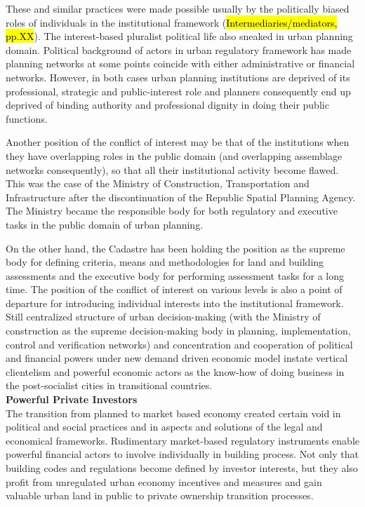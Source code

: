 \documentclass[11pt]{report}
\begin{document}
These and similar practices were made possible usually by the politically biased roles of individuals in the institutional framework (\hl{Intermediaries/mediators, pp.XX}).
The interest-based pluralist political life also sneaked in urban planning domain.
Political background of actors in urban regulatory framework has made planning networks at some points coincide with either administrative or financial networks.
However, in both cases urban planning institutions are deprived of its professional, strategic and public-interest role and planners consequently end up deprived of binding authority and professional dignity in doing their public functions.

Another position of the conflict of interest may be that of the institutions when they have overlapping roles in the public domain (and overlapping assemblage networks consequently), so that all their institutional activity become flawed.
This was the case of the Ministry of Construction, Transportation and Infrastructure after the discontinuation of the Republic Spatial Planning Agency. The Ministry became the responsible body for both regulatory and executive tasks in the public domain of urban planning.

On the other hand, the Cadastre has been holding the position  as the supreme body for defining criteria, means and methodologies for land and building assessments and the executive body for performing assessment tasks for a long time.
The position of the conflict of interest on various levels is also a point of departure for introducing individual interests into the institutional framework. Still centralized structure of urban decision-making (with the Ministry of construction as the supreme decision-making body in planning, implementation, control and verification networks) and concentration and cooperation of political and financial powers under new demand driven economic model instate vertical clientelism and powerful economic actors as the know-how of doing business in the post-socialist cities in transitional countries.
\\

\textbf{Powerful Private Investors}
\\
The transition from planned to market based economy created certain void in political and social practices and in aspects and solutions of the legal and economical frameworks.
Rudimentary market-based regulatory instruments enable powerful financial actors to involve individually in building process.
Not only that building codes and regulations become defined by investor interests, but they also profit from unregulated urban economy incentives and measures and gain valuable urban land in public to private ownership transition processes.
\end{document}
